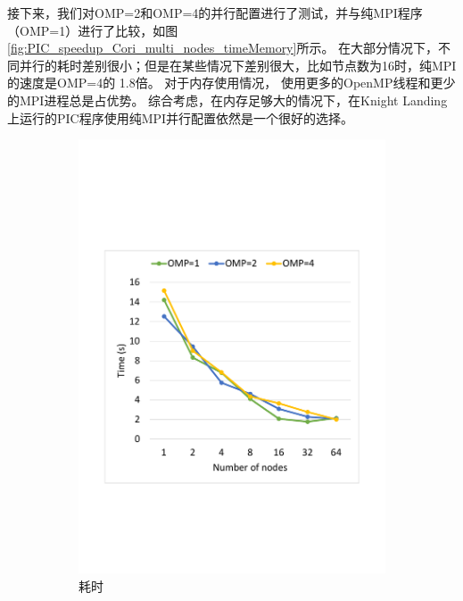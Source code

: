 接下来，我们对OMP=2和OMP=4的并行配置进行了测试，并与纯MPI程序（OMP=1）进行了比较，如图\ref{fig:PIC_speedup_Cori_multi_nodes_timeMemory}所示。
在大部分情况下，不同并行的耗时差别很小；但是在某些情况下差别很大，比如节点数为16时，纯MPI的速度是OMP=4的 1.8倍。
对于内存使用情况， 使用更多的OpenMP线程和更少的MPI进程总是占优势。
综合考虑，在内存足够大的情况下，在Knight Landing上运行的PIC程序使用纯MPI并行配置依然是一个很好的选择。

\begin{figure}[!htb]
    \centering
    \begin{subfigure}[b]{0.48\textwidth}
        \includegraphics[width=\textwidth]{Img/PIC_speedup_Cori_multi_nodes_time.pdf}
        \caption{耗时}
    \end{subfigure}
    \begin{subfigure}[b]{0.48\textwidth}

\end{subfigure}
\end{figure}
